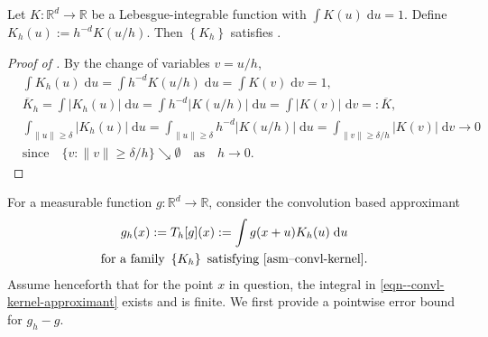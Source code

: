 \begin{lemma}
\label{lem--convl-kernel-eg}
Let \(K : \mathbb{R}^{d} \to \mathbb{R}\) be a Lebesgue-integrable function with
\(\int K (u) \; \mathrm{d} u = 1\).
Define \(K_{h} (u) := h^{- d} K (u / h)\).
Then \(\left\{ K_{h} \right\}\) satisfies .
\end{lemma}

\begin{proof}[Proof of ]
By the change of variables \(v = u / h\),
\begin{align*}
  & \int K_{h} (u) \; \mathrm{d} u = \int h^{- d} K (u / h) \; \mathrm{d} u =
  \int K (v) \; \mathrm{d} v = 1, \\
  & \overline{K}_{h} = \int \left| K_{h} (u) \right| \; \mathrm{d} u = \int h^{-
  d} |K (u / h)| \; \mathrm{d} u = \int |K (v)| \; \mathrm{d} v =: \overline{K},
  \\
  & \int_{\|u\| \geq \delta} \left| K_{h} (u) \right| \; \mathrm{d} u =
  \int_{\|u\| \geq \delta} h^{- d} \left| K (u / h) \right| \; \mathrm{d} u =
  \int_{\|v\| \geq \delta / h} |K (v)| \; \mathrm{d} v \to 0 \\
  & \text{since} \quad \{v : \|v\| \geq \delta / h\} \searrow \emptyset \quad
  \text{as} \quad h \to 0.
\end{align*}
\end{proof}

For a measurable function \(g : \mathbb{R}^{d} \to \mathbb{R}\),
consider the convolution based approximant
\begin{equation}
  \begin{gathered}
  g_{h} (x) := T_{h} [g] (x) := \int g (x + u) K_{h} (u) \; \mathrm{d} u \\
  \text{for a family } \left\{ K_{h} \right\} \text{ satisfying
  \Cref{asm--convl-kernel}.}
  \end{gathered}
  \label{eqn--convl-kernel-approximant}
\end{equation}
Assume henceforth that for the point \(x\) in question, the integral in
\eqref{eqn--convl-kernel-approximant} exists and is finite.
We first provide a pointwise error bound for \(g_{h} - g\).

